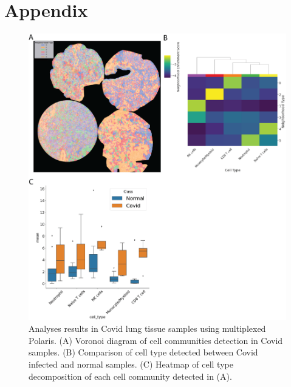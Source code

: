\section{Appendix}
\begin{figure}[htp]
\renewcommand{\figurename}{Figure}
    \centering
    \includegraphics[width=0.75\columnwidth]{Chapter3/Figures/Chap3_Apendix_covid.png}
    \caption[Analyses results in Covid tissue samples using multiplexed Polaris]{Analyses results in Covid lung tissue samples using multiplexed Polaris. (A) Voronoi diagram of cell communities detection in Covid samples. (B) Comparison of cell type detected between Covid infected and normal samples. (C) Heatmap of cell type decomposition of each cell community detected in (A).}
    \label{fig:Chap3_Covid_project}
\end{figure}

% 

% 


